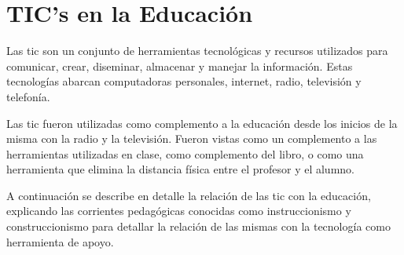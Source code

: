\chapter{TIC's en la Educación}
\label{chap:tics}


Las \Gls{tic} son un conjunto de herramientas tecnológicas y recursos utilizados
para comunicar, crear, diseminar, almacenar y manejar la
información\cite{unesco:ict}. Estas tecnologías abarcan computadoras personales,
internet, radio, televisión y telefonía\cite{tinio:ict}.

Las \Gls{tic} fueron utilizadas como complemento a la educación desde los
inicios de la misma con la radio y la televisión. Fueron vistas como un
complemento a las herramientas utilizadas en clase, como complemento del libro,
o como una herramienta que elimina la distancia física entre el profesor y el
alumno\cite{unesco:ict}. 

A continuación se describe en detalle la relación de las  \Gls{tic} con la educación, 
explicando las corrientes pedagógicas conocidas como instruccionismo y construccionismo 
para detallar la relación de las mismas con la tecnología como herramienta de apoyo.





%
%
%
%
%
